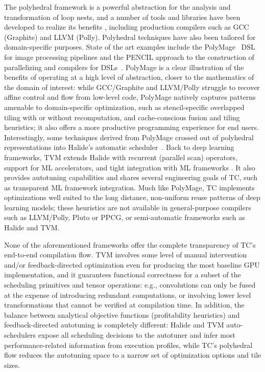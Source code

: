 
The polyhedral framework is a powerful abstraction for the analysis
and transformation of loop nests, and a number of tools and libraries
have been developed to realize its benefits
\cite{feautrier92multi,Bondhugula2008Pluto,PPCG2013,Bondhugula2016Pluto+,Zinenko2018Spatial},
including production compilers such as GCC (Graphite) and LLVM
(Polly).  Polyhedral techniques have also been tailored for
domain-specific purposes. State of the art examples include the
PolyMage~\cite{Polymage} DSL for image processing pipelines and the
PENCIL approach to the construction of parallelizing and compilers for
DSLs~\cite{Baghdadi2015Pencil,VOBLA}. PolyMage is a clear illustration
of the benefits of operating at a high level of abstraction, closer to
the mathematics of the domain of interest: while GCC/Graphite and
LLVM/Polly struggle to recover affine control and flow from low-level
code, PolyMage natively captures patterns amenable to domain-specific
optimization, such as stencil-specific overlapped tiling with or
without recomputation, and cache-conscious fusion and tiling
heuristics; it also offers a more productive programming experience
for end users.  Interestingly, some techniques derived from PolyMage
crossed out of polyhedral representations into Halide's automatic
scheduler~\cite{Mullapudi2016HalideAutoscheduler}.  Back to deep
learning frameworks, TVM extends Halide with recurrent (parallel scan)
operators, support for ML accelerators, and tight integration with ML
frameworks \cite{TVM}. It also provides autotuning
capabilities \cite{autotvm} and shares
several engineering goals of TC, such as transparent ML framework
integration.  Much like PolyMage, TC implements optimizations well
suited to the long distance, non-uniform reuse patterns of deep
learning models; these heuristics are not available in general-purpose
compilers such as LLVM/Polly, Pluto or PPCG, or semi-automatic frameworks
such as Halide and TVM.

None of the aforementioned frameworks offer the
complete transparency of TC's end-to-end compilation flow.
TVM involves some level of manual intervention and/or feedback-directed
optimization even for producing the most baseline GPU implementation,
and it guarantees functional correctness for a
subset of the scheduling primitives and tensor operations: e.g.,
convolutions can only be fused at the expense of introducing redundant
computations, or involving lower level transformations that cannot be
verified at compilation time. In addition, the balance between
analytical objective functions (profitability heuristics) and
feedback-directed autotuning is completely different: Halide and TVM
auto-schedulers expose all scheduling decisions to the autotuner and
infer most performance-related information from execution profiles,
while TC's polyhedral flow reduces the autotuning space to a narrow
set of optimization options and tile sizes.

